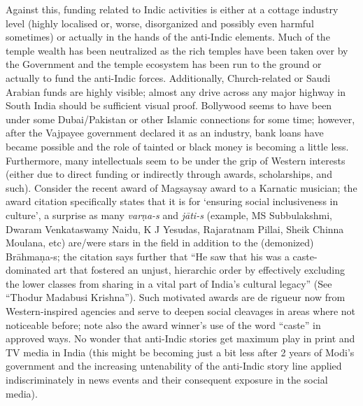 Against this, funding related to Indic activities is either at a cottage industry level (highly localised or, worse, disorganized and possibly even harmful sometimes) or actually in the hands of the anti-Indic elements. Much of the temple wealth has been neutralized as the rich temples have been taken over by the Government and the temple ecosystem has been run to the ground or actually to fund the anti-Indic forces. Additionally, Church-related or Saudi Arabian funds are highly visible; almost any drive across any major highway in South India should be sufficient visual proof.  Bollywood seems to have been under some Dubai/Pakistan or other Islamic connections for some time; however, after the Vajpayee government declared it as an industry, bank loans have became possible and the role of tainted or black money is becoming a little less.  Furthermore, many intellectuals seem to be under the grip of Western interests (either due to direct funding or indirectly through awards, scholarships, and such). Consider the recent award of Magsaysay award to a Karnatic musician; the award citation specifically states that it is for ‘ensuring social inclusiveness in culture’, a surprise as many {\sl varṇa-s} and \hbox{{\sl jāti-s}} (example, MS Subbulakshmi, Dwaram Venkataswamy Naidu, K J Yesudas, Rajaratnam Pillai, Sheik Chinna Moulana, etc) are/were stars in the field in addition to the (demonized) Brāhmaṇa-s; the citation says further that “He saw that his was a caste-dominated art that fostered an unjust, hierarchic order by effectively excluding the lower classes from sharing in a vital part of India’s cultural legacy” (See “Thodur Madabusi Krishna”). Such motivated awards are de rigueur now from Western-inspired agencies and serve to deepen social cleavages in areas where not noticeable before; note also the award winner’s use of the word “caste” in approved ways. No wonder that anti-Indic stories get maximum play in print and TV media in India (this might be becoming just a bit less after 2 years of Modi’s government and the increasing untenability of the anti-Indic story line applied indiscriminately in news events and their consequent exposure in the social media).

